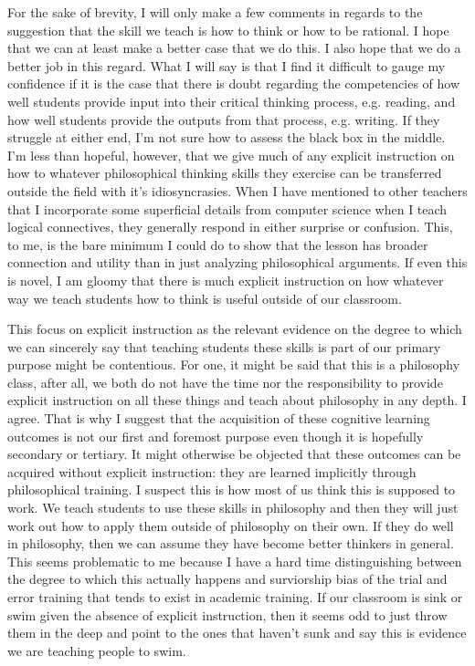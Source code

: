 \documentclass[letterpaper,notitlepage,12pt]{article}
\begin{document}
For the sake of brevity, I will only make a few comments in regards to the
suggestion that the skill we teach is how to think or how to be rational.
I hope that we can at least make a better case that we do this.
I also hope that we do a better job in this regard.
What I will say is that I find it difficult to gauge my confidence if it is the
case that there is doubt regarding the competencies of how well students provide
input into their critical thinking process, e.g. reading, and how well students
provide the outputs from that process, e.g. writing.
If they struggle at either end, I'm not sure how to assess the black box in the
middle.
I'm less than hopeful, however, that we give much of any explicit instruction on
how to whatever philosophical thinking skills they exercise can be transferred
outside the field with it's idiosyncrasies.
When I have mentioned to other teachers that I incorporate some superficial
details from computer science when I teach logical connectives, they generally
respond in either surprise or confusion.
This, to me, is the bare minimum I could do to show that the lesson has broader
connection and utility than in just analyzing philosophical arguments.
If even this is novel, I am gloomy that there is much explicit instruction on
how whatever way we teach students how to think is useful outside of our
classroom.

This focus on explicit instruction as the relevant evidence on the degree to
which we can sincerely say that teaching students these skills is part of our
primary purpose might be contentious.
For one, it might be said that this is a philosophy class, after all, we both do
not have the time nor the responsibility to provide explicit instruction on all
these things and teach about philosophy in any depth.
I agree.
That is why I suggest that the acquisition of these cognitive learning outcomes
is not our first and foremost purpose even though it is hopefully secondary or
tertiary.
It might otherwise be objected that these outcomes can be acquired without
explicit instruction: they are learned implicitly through philosophical
training.
I suspect this is how most of us think this is supposed to work.
We teach students to use these skills in philosophy and then they will just work
out how to apply them outside of philosophy on their own.
If they do well in philosophy, then we can assume they have become better
thinkers in general.
This seems problematic to me because I have a hard time distinguishing between
the degree to which this actually happens and surviorship bias of the trial and
error training that tends to exist in academic training.
If our classroom is sink or swim given the absence of explicit instruction, then
it seems odd to just throw them in the deep and point to the ones that haven't
sunk and say this is evidence we are teaching people to swim.
\end{document}
